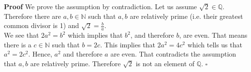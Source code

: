 {\color{solution}
	\textbf{Proof} We prove the assumption by contradiction.
	Let us assume $\sqrt{2} \in \mathbb{Q}.$ Therefore there are $a,b \in \mathbb{N}$ such that $a,b$ are relatively prime (i.e. their greatest common divisor is 1) and
	$\sqrt{2} = \frac{b}{a}$. \\
%	
	We see that $2a^2  = b^2$ which implies that $b^2$, and therefore $b$, are even. That means there is a $c \in \mathbb{N}$ such that $b = 2c$. This implies that
	$2a^2 = 4 c^2$ which tells us that $a^2 = 2 c^2$. Hence, $a^2$ and therefore $a$ are even. That contradicts the assumption that $a,b$ are relatively prime. Therefore $\sqrt{2}$ is not an element of $\mathbb{Q}$.
	\hfill $\square$
}